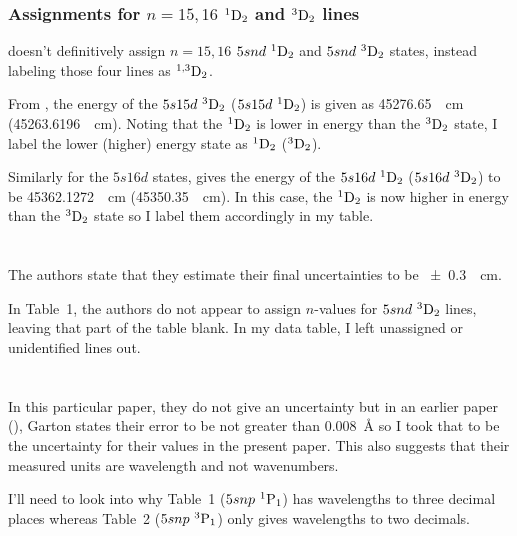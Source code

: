\documentclass{article}
\newcommand{\tsup}{\textsuperscript}													%
\newcommand{\tsub}{\textsubscript}														%
\newcommand{\SLJ}[3]{\tsup{#1}\textnormal{#2}\tsub{#3}}
\newcommand{\nSLJ}[4]{{#1}\textnormal{ }\SLJ{#2}{#3}{#4}}
\begin{document}
\subsubsection{Assignments for ${n=15,16}$ ${\SLJ{1}{D}{2}}$ and ${\SLJ{3}{D}{2}}$ lines}

\citeauthor{esh_1977} doesn't definitively assign ${n=15,16}$ ${\nSLJ{5snd}{1}{D}{2}}$ and ${\nSLJ{5snd}{3}{D}{2}}$ states, instead labeling those four lines as ${\SLJ{1,3}{D}{2}}$.

From \cite{san_2010}, the energy of the ${\nSLJ{5s15d}{3}{D}{2}}$ (${\nSLJ{5s15d}{1}{D}{2}}$) is given as \SI{45276.65}{\per\cm} (\SI{45263.6196}{\per\cm}). Noting that the $\SLJ{1}{D}{2}$ is lower in energy than the $\SLJ{3}{D}{2}$ state, I label the lower (higher) energy state as $\SLJ{1}{D}{2}$ ($\SLJ{3}{D}{2}$).

Similarly for the $5s16d$ states, \cite{san_2010} gives the energy of the $\nSLJ{5s16d}{1}{D}{2}$ ($\nSLJ{5s16d}{3}{D}{2}$) to be \SI{45362.1272}{\per\cm} (\SI{45350.35}{\per\cm}). In this case, the $\SLJ{1}{D}{2}$ is now higher in energy than the $\SLJ{3}{D}{2}$ state so I label them accordingly in my table.

\section{}

The authors state that they estimate their final uncertainties to be \SI{\pm 0.3}{\per\cm}. 

In Table~1, the authors do not appear to assign $n$-values for $\nSLJ{5snd}{3}{D}{2}$ lines, leaving that part of the table blank. In my data table, I left unassigned or unidentified lines out.

\section{}

In this particular paper, they do not give an uncertainty but in an earlier paper (\cite{gaw_1966}), Garton states their error to be not greater than \SI{0.008}{\angstrom} so I took that to be the uncertainty for their values in the present paper. This also suggests that their measured units are wavelength and not wavenumbers.

I'll need to look into why Table~1 ($\nSLJ{5snp}{1}{P}{1}$) has wavelengths to three decimal places whereas Table~2 ($\nSLJ{5snp}{3}{P}{1}$) only gives wavelengths to two decimals. 
\end{document}
